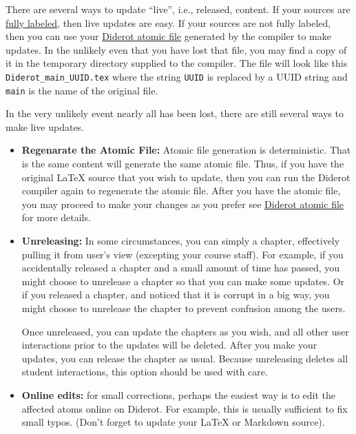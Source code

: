 \begin{gram}
There are several ways to update ``live'', i.e., released, content.
%
If your sources are
\href{sec:publish::full-labeling}{fully labeled}, then live updates are easy.
%
If your sources are not fully labeled, then you can use your
%
\href{grm:publisg::diderot-atomic}{Diderot atomic file}
%
generated by the compiler to make updates.
%
In the unlikely even that you have lost that file, you may find a copy of it in the temporary directory supplied to the compiler.  The file will look like this \lstinline`Diderot_main_UUID.tex` where the string \lstinline`UUID` is replaced by a UUID string and \lstinline`main` is the name of the original file.
%

In the very unlikely event nearly all has been lost, there are still several ways to make live updates.

\begin{itemize}
\item \textbf{Regenarate the Atomic File:} Atomic file generation is
  deterministic.  That is the same content will generate the same
  atomic file.  Thus, if you have the original LaTeX source that you wish to
  update, then you can run the Diderot compiler again to regenerate the atomic file.
  After you have the atomic file, you may proceed to make your changes
  as you prefer see
%
 \href{grm:publisg::diderot-atomic}{Diderot atomic  file} 
%
for more details.
%

\item \textbf{Unreleasing:}
In some circumstances, you can simply  a chapter, effectively pulling it from user's view (excepting your course staff).
%
For example,
if you accidentally released a chapter and a small amount of time has passed, you might choose to unrelease a chapter so that you can make some updates.
%
Or if you released a chapter, and noticed that it is corrupt in a big way, you might choose to unrelease the chapter to prevent confusion among the users.
%

Once unreleased, you can update the chapters as you wish, and all other user interactions  prior to the updates will be deleted.
%
After you make your updates, you can release the chapter as usual.
%
Because unreleasing deletes all student interactions, this option should be used with care.

\item \textbf{Online edits:}
for small corrections, perhaps the easiest way is to edit the affected atoms online on Diderot.  For example, this is usually sufficient to fix small typos.  (Don't forget to update your LaTeX or Markdown source).


\end{itemize}
\end{gram}
